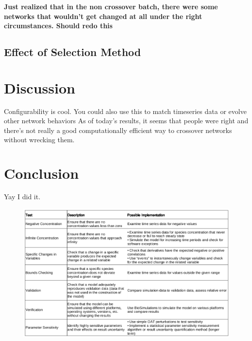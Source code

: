 \documentclass[12pt]{report}
\begin{document}
\textbf{Just realized that in the non crossover batch, there were some networks that wouldn't get changed at all under the right circumstances. Should redo this}

\subsection{Effect of Selection Method}

\section{Discussion}
Configurability is cool. 
You could also use this to match timeseries data or evolve other network behaviors
As of today's results, it seems that people were right and there's not really a good computationally efficient way to crossover networks without wrecking them.

\section{Conclusion}
Yay I did it.

	


\begin{figure}
    \centering
    \includegraphics[width=19cm]{images/testSummary.png}
    \label{table:sensitivity}
\end{figure}





\end{document}
